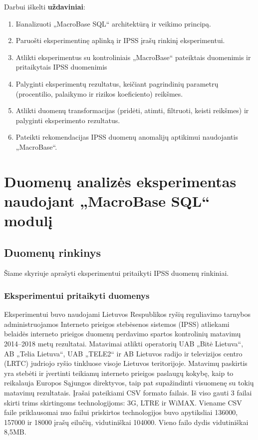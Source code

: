 \documentclass{VUMIFPSbakalaurinis}
\begin{document}
Darbui iškelti \textbf{uždaviniai}:
\begin{enumerate}
	\item Išanalizuoti „MacroBase SQL“ architektūrą ir veikimo principą.
	\item Paruošti eksperimentinę aplinką ir IPSS įrašų rinkinį eksperimentui.
	\item Atlikti eksperimentus su kontroliniais „MacroBase“ pateiktais duomenimis ir pritaikytais IPSS duomenimis	
	\item Palyginti eksperimentų rezultatus, keičiant pagrindinių parametrų (procentilio, palaikymo ir rizikos koeficiento) reikšmes.
	\item Atlikti duomenų transformacijas (pridėti, atimti, filtruoti, keisti reikšmes) ir palyginti eksperimento rezultatus.
	\item Pateikti rekomendacijas IPSS duomenų anomalijų aptikimui naudojantis „MacroBase“.
\end{enumerate}



\section{Duomenų analizės eksperimentas naudojant „MacroBase SQL“ modulį}

\subsection{Duomenų rinkinys}
Šiame skyriuje aprašyti eksperimentui pritaikyti IPSS duomenų rinkiniai.

\subsubsection{Eksperimentui pritaikyti duomenys}
Eksperimentui buvo naudojami Lietuvos Respublikos ryšių reguliavimo tarnybos administruojamos Interneto prieigos stebėsenos sistemos (IPSS) atliekami belaidės interneto prieigos duomenų perdavimo spartos kontrolinių matavimų 2014–2018 metų rezultatai. Matavimai atlikti operatorių UAB „Bitė Lietuva“, AB „Telia Lietuva“, UAB „TELE2“ ir AB Lietuvos radijo ir televizijos centro (LRTC) judriojo ryšio tinkluose visoje Lietuvos teritorijoje. Matavimų paskirtis yra stebėti ir įvertinti teikiamų interneto prieigos paslaugų kokybę, kaip to reikalauja Europos Sąjungos direktyvos, taip pat supažindinti visuomenę su tokių matavimų rezultatais. Įrašai pateikiami CSV formato failais. Iš viso gauti 3 failai skirti trims skirtingoms technologijoms: 3G, LTRE ir WiMAX. Viename CSV faile priklausomai nuo failui priskirtos technologijos buvo apytiksliai 136000, 157000 ir 18000 įrašų eilučių, vidutiniškai 104000. Vieno failo dydis vidutiniškai 8,5MB.
\end{document}
